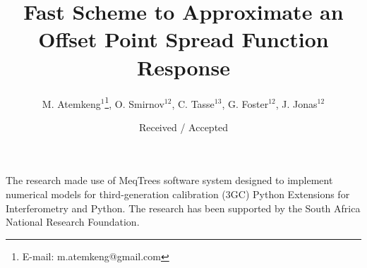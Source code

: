 \documentclass[]{aa}
\begin{document}
      

	      
\title{Fast Scheme to Approximate an Offset Point Spread Function Response}

\subtitle{}
\author{M. Atemkeng$^{1}$\thanks{E-mail: m.atemkeng@gmail.com}, O. Smirnov$^{12}$, 
 C. Tasse$^{13}$, G. Foster$^{12}$, J. Jonas$^{12}$}
\date{Received  / Accepted }


\abstract{
}




   \maketitle




 \begin{acknowledgements}
 The research  made use of  MeqTrees software system designed to implement numerical models for third-generation calibration (3GC) 
 Python Extensions for Interferometry and Python. The research has been supported by the South Africa National Research Foundation.
 \end{acknowledgements}

%
%


\appendix %

%
%

\end{document}
